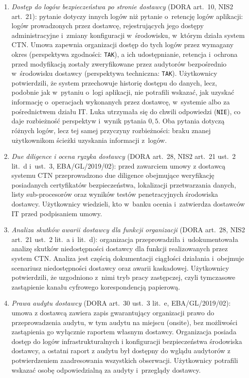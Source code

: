 \begin{enumerate}[label=(\roman*)]
\item \textit{Dostęp do logów bezpieczeństwa po stronie dostawcy} (DORA art.~10, NIS2 art.~21): pytanie dotyczy innych logów niż pytanie o~retencję logów aplikacji: logów prowadzonych przez dostawcę, rejestrujących jego dostępy administracyjne i~zmiany konfiguracji w~środowisku, w~którym działa system CTN. Umowa zapewnia organizacji dostęp do tych logów przez wymagany okres (perspektywa zgodności: \texttt{TAK}), a ich udostępnianie, retencja i~ochrona przed modyfikacją zostały zweryfikowane przez audytorów bezpośrednio w~środowisku dostawcy (perspektywa techniczna: \texttt{TAK}). Użytkownicy potwierdzili, że system przechowuje historię dostępu do danych, lecz, podobnie jak w~pytaniu o~logi aplikacji, nie potrafili wskazać, jak uzyskać informację o~operacjach wykonanych przez dostawcę, w~systemie albo za pośrednictwem działu IT. Luka utrzymała się do chwili odpowiedzi (\texttt{NIE}), co daje rozbieżność perspektyw i~wynik pytania $0{,}5$. Oba pytania dotyczą różnych logów, lecz tej samej przyczyny rozbieżności: braku znanej użytkownikom ścieżki uzyskania informacji z~logów.

\item \textit{Due diligence i ocena ryzyka dostawcy} (DORA art.~28, NIS2 art.~21 ust.~2 lit.~d i~ust.~3, EBA/GL/2019/02): przed zawarciem umowy z dostawcą systemu CTN przeprowadzono due diligence obejmujące weryfikację posiadanych certyfikatów bezpieczeństwa, lokalizacji przetwarzania danych, listy sub-procesorów oraz wyników testów penetracyjnych środowiska dostawcy. Użytkownicy wiedzieli, kto w~banku ocenia i~zatwierdza dostawców IT przed podpisaniem umowy.

\item \textit{Analiza skutków awarii dostawcy dla funkcji organizacji} (DORA art.~28, NIS2 art.~21 ust.~2 lit.~a i~lit.~d): organizacja przeprowadziła i~udokumentowała analizę skutków niedostępności dostawcy dla funkcji realizowanych przez system CTN. Analiza jest częścią dokumentacji ciągłości działania i~obejmuje scenariusz niedostępności dostawcy oraz awarii kaskadowej. Użytkownicy potwierdzili, że uzgodniono z~nimi tryb pracy zastępczej, czyli tymczasowe zastąpienie kanału cyfrowego korespondencją papierową.

\item \textit{Prawa audytu dostawcy} (DORA art.~30 ust.~3 lit.~e, EBA/GL/2019/02): umowa z dostawcą zawiera zapis gwarantujący organizacji prawo do przeprowadzenia audytu, w tym audytu na miejscu (onsite), bez możliwości zastąpienia go wyłącznie raportem własnym dostawcy. Organizacja posiada dostęp do logów infrastrukturalnych i konfiguracji bezpieczeństwa środowiska dostawcy, a ostatni raport z audytu był dostępny do wglądu audytorów z potwierdzeniem zaadresowania wszystkich obserwacji. Użytkownicy potrafili wskazać osobę odpowiedzialną za audyty i~przeglądy dostawcy.


\end{enumerate}

